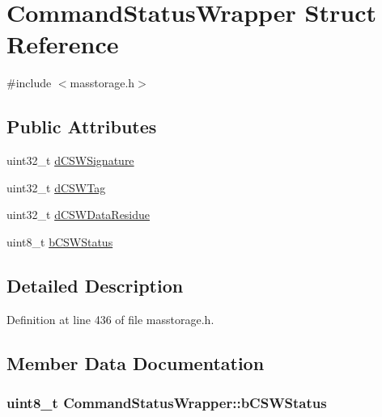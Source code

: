 \hypertarget{struct_command_status_wrapper}{\section{\-Command\-Status\-Wrapper \-Struct \-Reference}
\label{struct_command_status_wrapper}
}


{\ttfamily \#include $<$masstorage.\-h$>$}

\subsection*{\-Public \-Attributes}
\begin{DoxyCompactItemize}
\item 
uint32\-\_\-t \hyperlink{struct_command_status_wrapper_a498a87759e737395829b6ff4b6420ad1}{d\-C\-S\-W\-Signature}
\item 
uint32\-\_\-t \hyperlink{struct_command_status_wrapper_af872c29cfee3fb74e7ad9471ee4461fb}{d\-C\-S\-W\-Tag}
\item 
uint32\-\_\-t \hyperlink{struct_command_status_wrapper_adf944665d28bb394a3d9756e8418d09e}{d\-C\-S\-W\-Data\-Residue}
\item 
uint8\-\_\-t \hyperlink{struct_command_status_wrapper_a7170ed5bc0e2bbe04758e687beef4487}{b\-C\-S\-W\-Status}
\end{DoxyCompactItemize}


\subsection{\-Detailed \-Description}


\-Definition at line 436 of file masstorage.\-h.



\subsection{\-Member \-Data \-Documentation}
\hypertarget{struct_command_status_wrapper_a7170ed5bc0e2bbe04758e687beef4487}{
\subsubsection[{b\-C\-S\-W\-Status}]{\setlength{\rightskip}{0pt plus 5cm}uint8\-\_\-t {\bf \-Command\-Status\-Wrapper\-::b\-C\-S\-W\-Status}}}\label{struct_command_status_wrapper_a7170ed5bc0e2bbe04758e687beef4487}


